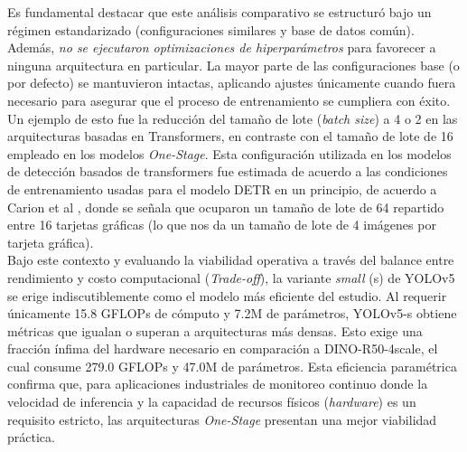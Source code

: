 Es fundamental destacar que este análisis comparativo se estructuró bajo un régimen estandarizado (configuraciones similares y base de datos común). Además, \textit{no se ejecutaron optimizaciones de hiperparámetros} para favorecer a ninguna arquitectura en particular. La mayor parte de las configuraciones base (o por defecto) se mantuvieron intactas, aplicando ajustes únicamente cuando fuera necesario para asegurar que el proceso de entrenamiento se cumpliera con éxito. Un ejemplo de esto fue la reducción del tamaño de lote (\textit{batch size}) a 4 o 2 en las arquitecturas basadas en Transformers, en contraste con el tamaño de lote de 16 empleado en los modelos \textit{One-Stage}. Esta configuración utilizada en los modelos de detección basados de transformers fue estimada de acuerdo a las condiciones de entrenamiento usadas para el modelo DETR en un principio, de acuerdo a Carion et al \cite{carion2020end}, donde se señala que ocuparon un tamaño de lote de 64 repartido entre 16 tarjetas gráficas (lo que nos da un tamaño de lote de 4 imágenes por tarjeta gráfica). \\

Bajo este contexto y evaluando la viabilidad operativa a través del balance entre rendimiento y costo computacional (\textit{Trade-off}), la variante \textit{small} (s) de YOLOv5 se erige indiscutiblemente como el modelo más eficiente del estudio. Al requerir únicamente 15.8 GFLOPs de cómputo y 7.2M de parámetros, YOLOv5-s obtiene métricas que igualan o superan a arquitecturas más densas. Esto exige una fracción ínfima del hardware necesario en comparación a DINO-R50-4scale, el cual consume 279.0 GFLOPs y 47.0M de parámetros. Esta eficiencia paramétrica confirma que, para aplicaciones industriales de monitoreo continuo donde la velocidad de inferencia y la capacidad de recursos físicos (\textit{hardware}) es un requisito estricto, las arquitecturas \textit{One-Stage} presentan una mejor viabilidad práctica.\\

